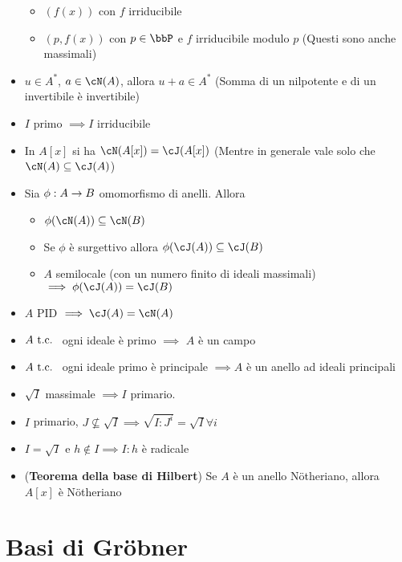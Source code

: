 \documentclass[a4paper,NoNotes,GeneralMath]{stdmdoc}
\begin{document}
\begin{itemize}
\begin{itemize}
				\item $(f(x))$ con $f$ irriducibile
				\item $(p, f(x))$ con $p \in \bbP$ e $f$ irriducibile modulo $p$ (Questi sono anche massimali)
			\end{itemize}
		\item $u \in A^*$, $a \in \cN(A)$, allora $u + a \in A^*$ (Somma di un nilpotente e di un invertibile è invertibile)
		\item $I$ primo $\implies I $ irriducibile
		\item In $A[x]$ si ha $\cN(A[x]) = \cJ(A[x])$ (Mentre in generale vale solo che $\cN(A) \subseteq \cJ(A)$)
		\item Sia $\phi: A \rightarrow B$ omomorfismo di anelli. Allora
			\begin{itemize}
				\item $\phi(\cN(A)) \subseteq \cN(B)$
				\item Se $\phi$ è surgettivo allora $\phi(\cJ(A)) \subseteq \cJ(B)$
				\item $A$ semilocale (con un numero finito di ideali massimali) $\implies \phi(\cJ(A)) = \cJ(B)$
			\end{itemize}
		\item $A$ PID $\implies \cJ(A) = \cN(A)$
		\item $A \mbox{ t.c. }$ ogni ideale è primo $\implies$ $A$ è un campo
		\item $A \mbox{ t.c. }$ ogni ideale primo è principale $\implies A$ è un anello ad ideali principali
		\item $\sqrt{I}$ massimale $\implies I$ primario.
		\item $I$ primario, $J \not\subseteq \sqrt{I} \implies \sqrt{I : J^i} = \sqrt{I} \forall i$
		\item $I = \sqrt{I}$ e $h \notin I \implies I:h$ è radicale
		\item ({\bf Teorema della base di Hilbert}) Se $A$ è un anello Nötheriano, allora $A[x]$ è Nötheriano
	\end{itemize}
	
	\section*{Basi di Gröbner}
\end{document}
